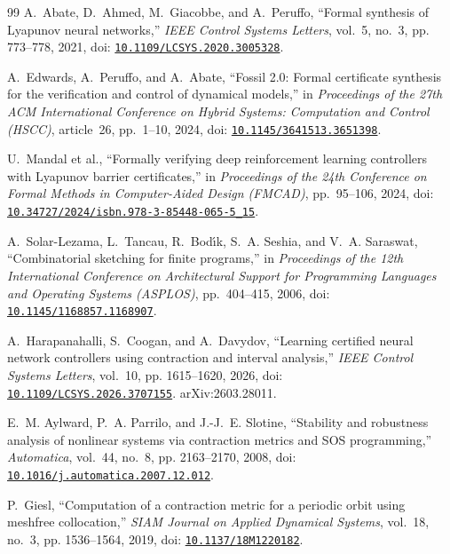 \documentclass[12pt,onecolumn,journal]{IEEEtran}
\begin{document}
\begin{thebibliography}{99}
A.~Abate, D.~Ahmed, M.~Giacobbe, and A.~Peruffo,
``Formal synthesis of Lyapunov neural networks,''
\emph{IEEE Control Systems Letters}, vol.~5, no.~3, pp. 773--778, 2021, doi: \href{https://doi.org/10.1109/LCSYS.2020.3005328}{\nolinkurl{10.1109/LCSYS.2020.3005328}}.

A.~Edwards, A.~Peruffo, and A.~Abate,
``Fossil 2.0: Formal certificate synthesis for the verification and control of dynamical models,''
in \emph{Proceedings of the 27th ACM International Conference on Hybrid Systems: Computation and Control (HSCC)}, article~26, pp.~1--10, 2024, doi: \href{https://doi.org/10.1145/3641513.3651398}{\nolinkurl{10.1145/3641513.3651398}}.

U.~Mandal et al.,
``Formally verifying deep reinforcement learning controllers with Lyapunov barrier certificates,''
in \emph{Proceedings of the 24th Conference on Formal Methods in Computer-Aided Design (FMCAD)}, pp.~95--106, 2024, doi: \href{https://doi.org/10.34727/2024/isbn.978-3-85448-065-5_15}{\nolinkurl{10.34727/2024/isbn.978-3-85448-065-5_15}}.

A.~Solar-Lezama, L.~Tancau, R.~Bod\'{\i}k, S.~A. Seshia, and V.~A. Saraswat,
``Combinatorial sketching for finite programs,''
in \emph{Proceedings of the 12th International Conference on Architectural Support for Programming Languages and Operating Systems (ASPLOS)}, pp.~404--415, 2006, doi: \href{https://doi.org/10.1145/1168857.1168907}{\nolinkurl{10.1145/1168857.1168907}}.

A.~Harapanahalli, S.~Coogan, and A.~Davydov,
``Learning certified neural network controllers using contraction and interval analysis,''
\emph{IEEE Control Systems Letters}, vol.~10, pp. 1615--1620, 2026, doi: \href{https://doi.org/10.1109/LCSYS.2026.3707155}{\nolinkurl{10.1109/LCSYS.2026.3707155}}. arXiv:2603.28011.

E.~M. Aylward, P.~A. Parrilo, and J.-J.~E. Slotine,
``Stability and robustness analysis of nonlinear systems via contraction metrics and SOS programming,''
\emph{Automatica}, vol.~44, no.~8, pp. 2163--2170, 2008, doi: \href{https://doi.org/10.1016/j.automatica.2007.12.012}{\nolinkurl{10.1016/j.automatica.2007.12.012}}.

P.~Giesl,
``Computation of a contraction metric for a periodic orbit using meshfree collocation,''
\emph{SIAM Journal on Applied Dynamical Systems}, vol.~18, no.~3, pp. 1536--1564, 2019, doi: \href{https://doi.org/10.1137/18M1220182}{\nolinkurl{10.1137/18M1220182}}.


\end{thebibliography}
\end{document}
